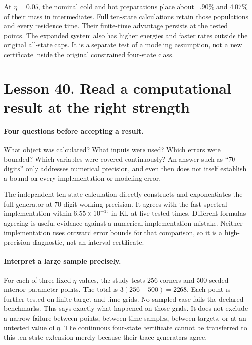 At $\eta=0.05$, the nominal cold and hot preparations place about $1.90\%$
and $4.07\%$ of their mass in intermediates. Full ten-state calculations
retain those populations and every residence time. Their finite-time
advantage persists at the tested points. The expanded system also has
higher energies and faster rates outside the original all-state caps.
It is a separate test of a modeling assumption, not a new certificate
inside the original constrained four-state class.

\section*{Lesson 40. Read a computational result at the right strength}
\paragraph{Four questions before accepting a result.}
What object was calculated? What inputs were used? Which errors were bounded?
Which variables were covered continuously? An answer such as ``70 digits''
only addresses numerical precision, and even then does not itself establish
a bound on every implementation or modeling error.

The independent ten-state calculation directly constructs and exponentiates
the full generator at 70-digit working precision. It agrees with the fast
spectral implementation within $6.55\times10^{-13}$ in KL at five tested
times. Different formulas agreeing is useful evidence against a numerical
implementation mistake. Neither implementation uses outward error bounds
for that comparison, so it is a high-precision diagnostic, not an interval
certificate.

\paragraph{Interpret a large sample precisely.}
For each of three fixed $\eta$ values, the study tests 256 corners and 500
seeded interior parameter points. The total is $3(256+500)=2268$.
Each point is further tested on finite target and time grids. No sampled
case fails the declared benchmarks. This says exactly what happened on
those grids. It does not exclude a narrow failure between points, between
time samples, between targets, or at an untested value of $\eta$.
The continuous four-state certificate cannot be transferred to this
ten-state extension merely because their trace generators agree.

